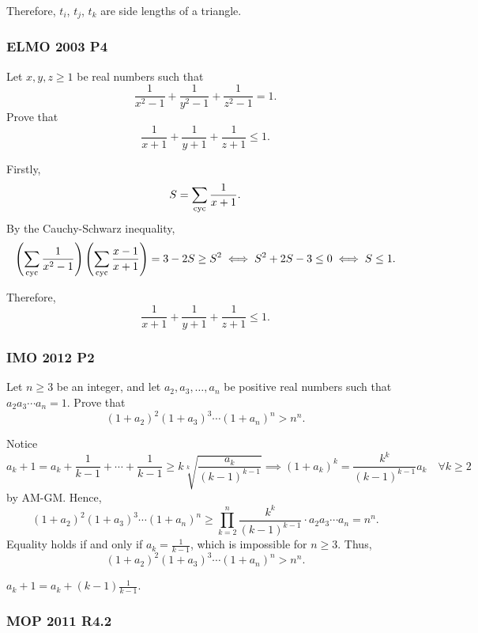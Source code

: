 Therefore, $t_i$, $t_j$, $t_k$ are side lengths of a triangle.

\clearpage

\subsubsection{ELMO 2003 P4}

\begin{problem}
Let $x,y,z \ge 1$ be real numbers such that\[ \frac{1}{x^2-1} + \frac{1}{y^2-1} + \frac{1}{z^2-1} = 1. \]Prove that\[ \frac{1}{x+1} + \frac{1}{y+1} + \frac{1}{z+1} \le 1. \]
\end{problem}

Firstly,
\[
	S=\sum_{\text{cyc}} \frac{1}{x+1}.
\]
By the Cauchy-Schwarz inequality,
\[
	\left(\sum_{\text{cyc}} \frac{1}{x^2-1}\right)\left(\sum_{\text{cyc}} \frac{x-1}{x+1}\right) = 3 - 2S \ge S^2 \iff S^2+2S-3 \le 0 \iff S \le 1.
\]

Therefore,
\[ \frac{1}{x+1} + \frac{1}{y+1} + \frac{1}{z+1} \le 1. \]

\clearpage

\subsubsection{IMO 2012 P2}

\begin{problem}
Let $n\ge 3$ be an integer, and let $a_2,a_3,\ldots ,a_n$ be positive real numbers such that $a_{2}a_{3}\cdots a_{n}=1$. Prove that
\[(1 + a_2)^2 (1 + a_3)^3 \dotsm (1 + a_n)^n > n^n.\]
\end{problem}

Notice
\[
	a_k+1=a_k+\frac{1}{k-1}+\cdots+\frac{1}{k-1} \ge k\sqrt[k]{\frac{a_k}{(k-1)^{k-1}}} \implies (1+a_k)^k = \frac{k^k}{(k-1)^{k-1}}a_k \quad \forall k \ge 2
\]
by AM-GM. Hence,
\[
	(1 + a_2)^2 (1 + a_3)^3 \dotsm (1 + a_n)^n \ge \prod_{k=2}^{n} \frac{k^k}{(k-1)^{k-1}} \cdot a_2a_3\cdots a_n =
	n^n.
\]
Equality holds if and only if $a_k=\frac{1}{k-1}$, which is impossible for $n \ge 3$.
Thus,
\[
	(1 + a_2)^2 (1 + a_3)^3 \dotsm (1 + a_n)^n > n^n.
\]

\begin{insight}
	$a_k+1=a_k+(k-1)\frac{1}{k-1}$.
\end{insight}

\clearpage

\subsubsection{MOP 2011 R4.2}

